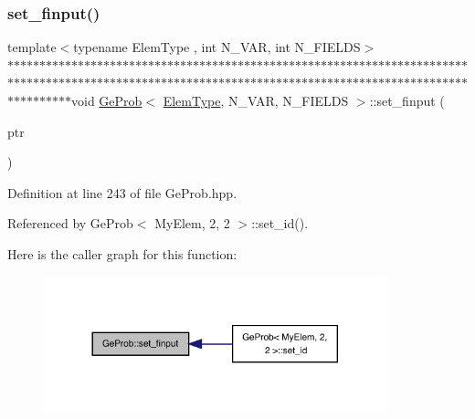 \subsubsection{\texorpdfstring{set\+\_\+finput()}{set\_finput()}}
{\footnotesize\ttfamily template$<$typename Elem\+Type , int N\+\_\+\+V\+AR, int N\+\_\+\+F\+I\+E\+L\+DS$>$ \\
$\ast$$\ast$$\ast$$\ast$$\ast$$\ast$$\ast$$\ast$$\ast$$\ast$$\ast$$\ast$$\ast$$\ast$$\ast$$\ast$$\ast$$\ast$$\ast$$\ast$$\ast$$\ast$$\ast$$\ast$$\ast$$\ast$$\ast$$\ast$$\ast$$\ast$$\ast$$\ast$$\ast$$\ast$$\ast$$\ast$$\ast$$\ast$$\ast$$\ast$$\ast$$\ast$$\ast$$\ast$$\ast$$\ast$$\ast$$\ast$$\ast$$\ast$$\ast$$\ast$$\ast$$\ast$$\ast$$\ast$$\ast$$\ast$$\ast$$\ast$$\ast$$\ast$$\ast$$\ast$$\ast$$\ast$$\ast$$\ast$$\ast$$\ast$$\ast$$\ast$$\ast$$\ast$$\ast$$\ast$$\ast$$\ast$$\ast$$\ast$$\ast$$\ast$$\ast$$\ast$$\ast$$\ast$$\ast$$\ast$$\ast$$\ast$$\ast$$\ast$$\ast$$\ast$$\ast$$\ast$$\ast$$\ast$$\ast$$\ast$$\ast$$\ast$$\ast$$\ast$$\ast$$\ast$$\ast$$\ast$$\ast$$\ast$$\ast$$\ast$$\ast$$\ast$$\ast$$\ast$$\ast$$\ast$$\ast$$\ast$$\ast$$\ast$$\ast$$\ast$$\ast$$\ast$$\ast$$\ast$$\ast$$\ast$$\ast$$\ast$$\ast$$\ast$$\ast$$\ast$$\ast$$\ast$$\ast$$\ast$$\ast$$\ast$$\ast$$\ast$$\ast$$\ast$$\ast$$\ast$$\ast$$\ast$$\ast$$\ast$$\ast$$\ast$void \hyperlink{classGeProb}{Ge\+Prob}$<$ \hyperlink{spectral_8h_aaa2c1a7b2d1b12c590d730fe6ac839fa}{Elem\+Type}, N\+\_\+\+V\+AR, N\+\_\+\+F\+I\+E\+L\+DS $>$\+::set\+\_\+finput (\begin{DoxyParamCaption}\item[{F\+I\+LE $\ast$}]{ptr }\end{DoxyParamCaption})}



Definition at line 243 of file Ge\+Prob.\+hpp.



Referenced by Ge\+Prob$<$ My\+Elem, 2, 2 $>$\+::set\+\_\+id().

Here is the caller graph for this function\+:
\nopagebreak
\begin{figure}[H]
\begin{center}
\leavevmode
\includegraphics[width=281pt]{classGeProb_adc17f3e57dab093882ec7f7aebea634f_icgraph}
\end{center}
\end{figure}
\mbox{\label{classGeProb_adba307125006b1f5e0bd9a04e05cecf2}} 
